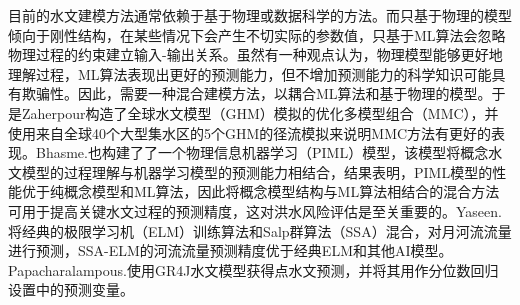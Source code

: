 \documentclass{ctexart}
\begin{document}
目前的水文建模方法通常依赖于基于物理或数据科学的方法。而只基于物理的模型倾向于刚性结构，在某些情况下会产生不切实际的参数值，只基于ML算法会忽略物理过程的约束建立输入-输出关系。虽然有一种观点认为，物理模型能够更好地理解过程，ML算法表现出更好的预测能力，但不增加预测能力的科学知识可能具有欺骗性。因此，需要一种混合建模方法，以耦合ML算法和基于物理的模型。于是Zaherpour\cite{zaherpour2019exploring}构造了全球水文模型（GHM）模拟的优化多模型组合（MMC），并使用来自全球40个大型集水区的5个GHM的径流模拟来说明MMC方法有更好的表现。Bhasme.\cite{bhasme2021enhancing}也构建了了一个物理信息机器学习（PIML）模型，该模型将概念水文模型的过程理解与机器学习模型的预测能力相结合，结果表明，PIML模型的性能优于纯概念模型和ML算法，因此将概念模型结构与ML算法相结合的混合方法可用于提高关键水文过程的预测精度，这对洪水风险评估是至关重要的。Yaseen.\cite{yaseen2020hybridized}将经典的极限学习机（ELM）训练算法和Salp群算法（SSA）混合，对月河流流量进行预测，SSA-ELM的河流流量预测精度优于经典ELM和其他AI模型。Papacharalampous.\cite{papacharalampous2019probabilistic}使用GR4J水文模型获得点水文预测，并将其用作分位数回归设置中的预测变量。




\end{document}
